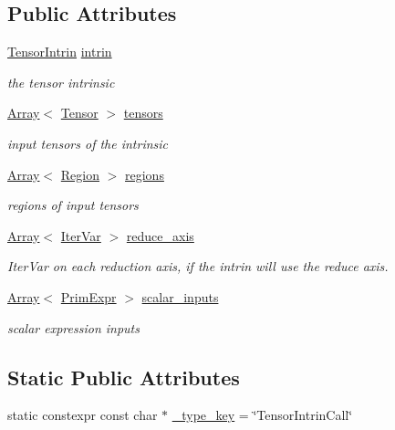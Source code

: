 \subsection*{Public Attributes}
\begin{DoxyCompactItemize}
\item 
\hyperlink{classtvm_1_1te_1_1TensorIntrin}{Tensor\+Intrin} \hyperlink{classtvm_1_1te_1_1TensorIntrinCallNode_adf0605632cdbe20556abffee3aa3850e}{intrin}
\begin{DoxyCompactList}\small\item\em the tensor intrinsic \end{DoxyCompactList}\item 
\hyperlink{classtvm_1_1Array}{Array}$<$ \hyperlink{classtvm_1_1te_1_1Tensor}{Tensor} $>$ \hyperlink{classtvm_1_1te_1_1TensorIntrinCallNode_a92b543750ea55b9cfd6852139e2ddbd6}{tensors}
\begin{DoxyCompactList}\small\item\em input tensors of the intrinsic \end{DoxyCompactList}\item 
\hyperlink{classtvm_1_1Array}{Array}$<$ \hyperlink{namespacetvm_1_1tir_a8277e2a3d81a80a4776705673df51e0a}{Region} $>$ \hyperlink{classtvm_1_1te_1_1TensorIntrinCallNode_a4c934a6d85bf27b3263ad0d79fb17144}{regions}
\begin{DoxyCompactList}\small\item\em regions of input tensors \end{DoxyCompactList}\item 
\hyperlink{classtvm_1_1Array}{Array}$<$ \hyperlink{classtvm_1_1tir_1_1IterVar}{Iter\+Var} $>$ \hyperlink{classtvm_1_1te_1_1TensorIntrinCallNode_a3bd0fd4dc7145a22d38d62037838ccfe}{reduce\+\_\+axis}
\begin{DoxyCompactList}\small\item\em Iter\+Var on each reduction axis, if the intrin will use the reduce axis. \end{DoxyCompactList}\item 
\hyperlink{classtvm_1_1Array}{Array}$<$ \hyperlink{classtvm_1_1PrimExpr}{Prim\+Expr} $>$ \hyperlink{classtvm_1_1te_1_1TensorIntrinCallNode_a862c22c7362a799b0f44de41920bffc8}{scalar\+\_\+inputs}
\begin{DoxyCompactList}\small\item\em scalar expression inputs \end{DoxyCompactList}\end{DoxyCompactItemize}
\subsection*{Static Public Attributes}
\begin{DoxyCompactItemize}
\item 
static constexpr const char $\ast$ \hyperlink{classtvm_1_1te_1_1TensorIntrinCallNode_aa58faae58da2ce9f2a46aa6664e85f36}{\+\_\+type\+\_\+key} = \char`\"{}Tensor\+Intrin\+Call\char`\"{}
\end{DoxyCompactItemize}


